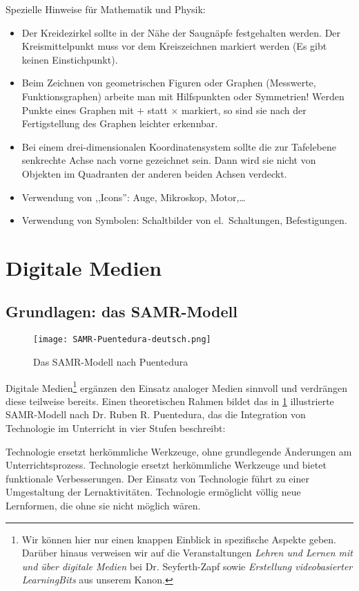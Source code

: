 Spezielle Hinweise f\"{u}r Mathematik und Physik:
\begin{itemize}
\item
Der Kreidezirkel sollte in der N\"{a}he der Saugn\"{a}pfe
festgehalten werden.
Der Kreismittelpunkt muss vor dem Kreiszeichnen markiert werden
(Es gibt keinen Einstichpunkt).
\item
Beim Zeichnen von geometrischen Figuren oder Graphen
(Messwerte, Funktionsgraphen) arbeite man mit Hilfspunkten oder
Symmetrien! Werden Punkte eines Graphen mit $+$ statt $\times$ markiert,
so sind sie nach der Fertigstellung des Graphen leichter
erkennbar.
\item
Bei einem drei-dimensionalen  Koordinatensystem sollte die
zur Tafelebene senkrechte Achse nach vorne gezeichnet sein.
Dann wird sie nicht von Objekten im Quadranten der anderen beiden
Achsen verdeckt.
\item
Verwendung von ,,Icons'':
Auge, Mikroskop, Motor,\dots

\item
Verwendung von Symbolen: Schaltbilder von el.\ Schaltungen,
Befestigungen.
\end{itemize}

\section{Digitale Medien}
\subsection{Grundlagen: das SAMR-Modell}
\begin{figure}
	\centering
	\texttt{[image: SAMR-Puentedura-deutsch.png]}
	\caption{Das SAMR-Modell nach Puentedura}\label{fig:samr}
\end{figure}

Digitale Medien\footnote{Wir können hier nur einen knappen Einblick in spezifische Aspekte geben. Darüber hinaus verweisen wir auf die Veranstaltungen \emph{Lehren und Lernen mit und über digitale Medien} bei Dr. Seyferth-Zapf sowie \emph{Erstellung videobasierter LearningBits} aus unserem Kanon.} ergänzen den Einsatz analoger Medien sinnvoll und verdrängen diese teilweise bereits. Einen theoretischen Rahmen bildet das in \cref{fig:samr} illustrierte SAMR-Modell nach Dr. Ruben R. Puentedura, das die Integration von Technologie im Unterricht in vier Stufen beschreibt:
\begin{enumerate}
	 Technologie ersetzt herkömmliche Werkzeuge, ohne grundlegende Änderungen am Unterrichtsprozess.
	 Technologie ersetzt herkömmliche Werkzeuge und bietet funktionale Verbesserungen.
	 Der Einsatz von Technologie führt zu einer Umgestaltung der Lernaktivitäten.
	 Technologie ermöglicht völlig neue Lernformen, die ohne sie nicht möglich wären.
\end{enumerate}

